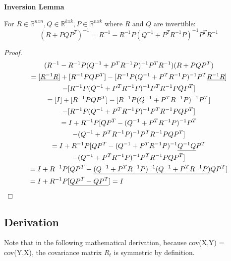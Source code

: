\begin{lemma}{\textbf{Inversion Lemma \cite{probabilisticRobotics}}} \label{lemmaInversion}
	
For \(R \in \mathbb{R}^{nxn}, Q \in \mathbb{R}^{kxk}, P \in \mathbb{R}^{nxk}\) where \(R\) and \(Q\) are invertible:
\[
(R + PQP^T)^{-1} = R^{-1} - R^{-1}P(Q^{-1} + P^T R^{-1}P)^{-1} P^T R^{-1}
\]
\end{lemma}
\begin{proof}
\begin{multline}
( R^{-1} - R^{-1}P(Q^{-1} + P^T R^{-1}P)^{-1} P^T R^{-1}) (R + PQP^T) \\
= [\underline{R^{-1}R}] + [R^{-1}PQP^T] - [R^{-1}P(Q^{-1} + P^T R^{-1}P)^{-1} P^T \underline{R^{-1}R}] \\
- [R^{-1}P(Q^{-1} + P^T R^{-1}P)^{-1} P^T R^{-1}PQP^T] \\
= [I] + [R^{-1}PQP^T] - [R^{-1}P(Q^{-1} + P^T R^{-1}P)^{-1} P^T] \\
- [R^{-1}P(Q^{-1} + P^T R^{-1}P)^{-1} P^T R^{-1}PQP^T] \\
= I + R^{-1}P [QP^T - (Q^{-1} + P^T R^{-1}P)^{-1} P^T \\
- (Q^{-1} + P^T R^{-1}P)^{-1} P^T R^{-1}PQP^T] \\
= I + R^{-1}P [QP^T - (Q^{-1} + P^T R^{-1}P)^{-1} \underline{Q^{-1} Q} P^T \\
- (Q^{-1} + P^T R^{-1}P)^{-1} P^T R^{-1}PQP^T] \\
= I + R^{-1}P [QP^T - \underline{(Q^{-1} + P^T R^{-1}P)^{-1} (Q^{-1} + P^T R^{-1}P)} Q P^T] \\
= I + R^{-1}P [\underline{QP^T - Q P^T}] = I \hfill
\end{multline}
\end{proof}


\subsection{Derivation}
Note that in the following mathematical derivation, because cov(X,Y) = cov(Y,X), the covariance matrix \(R_t\) is symmetric by definition.


